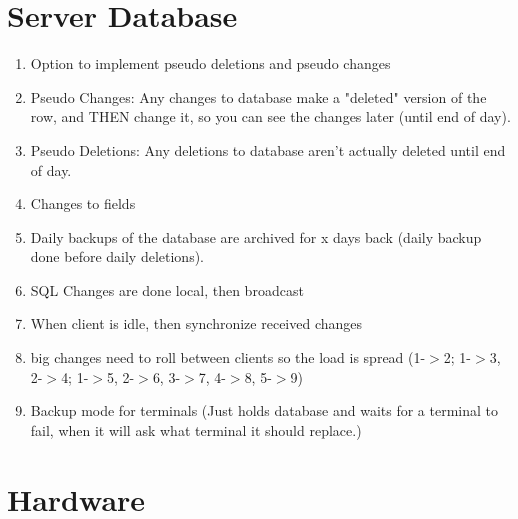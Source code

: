 \section{Server Database}
\begin{enumerate}
	\item Option to implement pseudo deletions and pseudo changes
	\item Pseudo Changes: Any changes to database make a "deleted" version of the row, and THEN change it, so you can see the changes later (until end of day).
	\item Pseudo Deletions: Any deletions to database aren't actually deleted until end of day. 
	\item Changes to fields
	\item Daily backups of the database are archived for x days back (daily backup done before daily deletions).
	\item SQL Changes are done local, then broadcast
	\item When client is idle, then synchronize received changes
	\item big changes need to roll between clients so the load is spread (1-$>$2; 1-$>$3, 2-$>$4; 1-$>$5, 2-$>$6, 3-$>$7, 4-$>$8, 5-$>$9)
	\item Backup mode for terminals (Just holds database and waits for a terminal to fail, when it will ask what terminal it should replace.)
\end{enumerate}

\section{Hardware}
